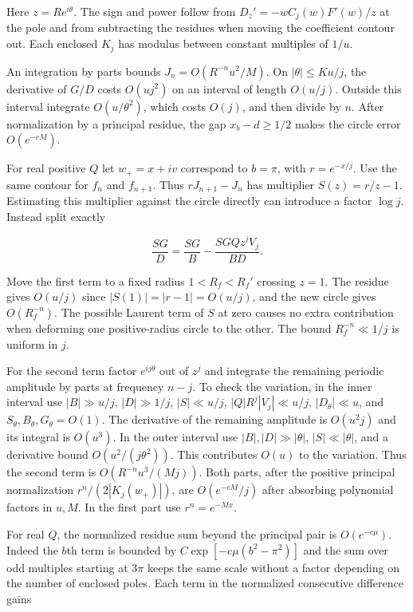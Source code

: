 \documentclass[11pt]{article}
\begin{document}
Here \(z=Re^{i\theta}\). The sign and power follow from \(D_z'=-w C_j(w)F'(w)/z\) at the pole and from subtracting the residues when moving the coefficient contour out. Each enclosed \(K_j\) has modulus between constant multiples of \(1/u\).

An integration by parts bounds \(J_n=O(R^{-n}u^2/M)\). On \(|\theta|\le Ku/j\), the derivative of \(G/D\) costs \(O(uj^2)\) on an interval of length \(O(u/j)\). Outside this interval integrate \(O(u/\theta^2)\), which costs \(O(j)\), and then divide by \(n\). After normalization by a principal residue, the gap \(x_b-d\ge1/2\) makes the circle error \(O(e^{-cM})\).

For real positive \(Q\) let \(w_+=x+iv\) correspond to \(b=\pi\), with \(r=e^{-x/j}\). Use the same contour for \(f_n\) and \(f_{n+1}\). Thus \(rJ_{n+1}-J_n\) has multiplier \(S(z)=r/z-1\). Estimating this multiplier against the circle directly can introduce a factor \(\log j\). Instead split exactly

\begin{equation*}
\frac{SG}{D}=\frac{SG}{B}-\frac{SG Qz^j V_j}{BD}.
\end{equation*}

Move the first term to a fixed radius \(1<R_f<R_f'\) crossing \(z=1\). The residue gives \(O(u/j)\) since \(|S(1)|=|r-1|=O(u/j)\), and the new circle gives \(O(R_f^{-n})\). The possible Laurent term of \(S\) at zero causes no extra contribution when deforming one positive-radius circle to the other. The bound \(R_f^{-n}\ll1/j\) is uniform in \(j\).

For the second term factor \(e^{ij\theta}\) out of \(z^j\) and integrate the remaining periodic amplitude by parts at frequency \(n-j\). To check the variation, in the inner interval use \(|B|\gg u/j\), \(|D|\gg1/j\), \(|S|\ll u/j\), \(|Q|R^j|V_j|\ll u/j\), \(|D_\theta|\ll u\), and \(S_\theta,B_\theta,G_\theta=O(1)\). The derivative of the remaining amplitude is \(O(u^2j)\) and its integral is \(O(u^3)\). In the outer interval use \(|B|,|D|\gg|\theta|\), \(|S|\ll|\theta|\), and a derivative bound \(O(u^2/(j\theta^2))\). This contributes \(O(u)\) to the variation. Thus the second term is \(O(R^{-n}u^3/(Mj))\). Both parts, after the positive principal normalization \(r^n/(2|K_j(w_+)|)\), are \(O(e^{-cM}/j)\) after absorbing polynomial factors in \(u,M\). In the first part use \(r^n=e^{-Mx}\).

For real \(Q\), the normalized residue sum beyond the principal pair is \(O(e^{-c\mu})\). Indeed the \(b\)th term is bounded by \(C\exp[-c\mu(b^2-\pi^2)]\) and the sum over odd multiples starting at \(3\pi\) keeps the same scale without a factor depending on the number of enclosed poles. Each term in the normalized consecutive difference gains
\end{document}
